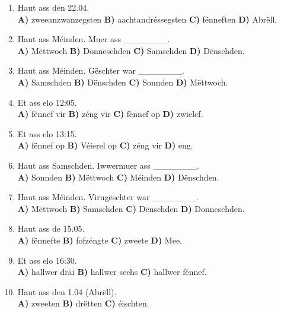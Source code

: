 \begin{enumerate}
    \item Haut ass den 22.04. \\
    \textbf{A)} zweeanzwanzegsten \quad \textbf{B)} aachtandréssegsten \quad \textbf{C)} fënneften \quad \textbf{D)} Abrëll.
    
    \item Haut ass Méinden. Muer ass \_\_\_\_\_\_\_. \\
    \textbf{A)} Mëttwoch \quad \textbf{B)} Donneschden \quad \textbf{C)} Samschden \quad \textbf{D)} Dënschden.
    
    \item Haut ass Méinden. Gëschter war \_\_\_\_\_\_\_. \\
    \textbf{A)} Samschden \quad \textbf{B)} Dënschden \quad \textbf{C)} Sonnden \quad \textbf{D)} Mëttwoch.
    
    \item Et ass elo 12:05. \\
    \textbf{A)} fënnef vir \quad \textbf{B)} zéng vir \quad \textbf{C)} fënnef op \quad \textbf{D)} zwielef.
    
    \item Et ass elo 13:15. \\
    \textbf{A)} fënnef op \quad \textbf{B)} Véierel op \quad \textbf{C)} zéng vir \quad \textbf{D)} eng.
    
    \item Haut ass Samschden. Iwwermuer ass \_\_\_\_\_\_\_. \\
    \textbf{A)} Sonnden \quad \textbf{B)} Mëttwoch \quad \textbf{C)} Méinden \quad \textbf{D)} Dënschden.
    
    \item Haut ass Méinden. Virugëschter war \_\_\_\_\_\_\_. \\
    \textbf{A)} Mëttwoch \quad \textbf{B)} Samschden \quad \textbf{C)} Dënschden \quad \textbf{D)} Donneschden.
    
    \item Haut ass de 15.05. \\
    \textbf{A)} fënnefte \quad \textbf{B)} fofzéngte \quad \textbf{C)} zweete \quad \textbf{D)} Mee.
    
    \item Et ass elo 16:30. \\
    \textbf{A)} hallwer dräi \quad \textbf{B)} hallwer sechs \quad \textbf{C)} hallwer fënnef.
    
    \item Haut ass den 1.04 (Abrëll). \\
    \textbf{A)} zweeten \quad \textbf{B)} drëtten \quad \textbf{C)} éischten.
    

\end{enumerate}
